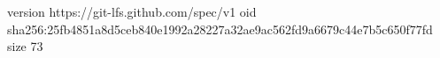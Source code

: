 version https://git-lfs.github.com/spec/v1
oid sha256:25fb4851a8d5ceb840e1992a28227a32ae9ac562fd9a6679c44e7b5c650f77fd
size 73
